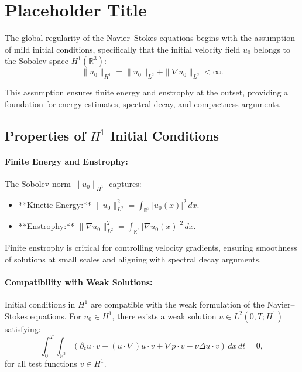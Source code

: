 \section{Placeholder Title}

The global regularity of the Navier--Stokes equations begins with the assumption of mild initial conditions, specifically that the initial velocity field $u_0$ belongs to the Sobolev space $H^1(\mathbb{R}^3)$:
\begin{equation}
\|u_0\|_{H^1} = \|u_0\|_{L^2} + \|\nabla u_0\|_{L^2} < \infty.
\end{equation}

This assumption ensures finite energy and enstrophy at the outset, providing a foundation for energy estimates, spectral decay, and compactness arguments.

\subsection{Properties of $H^1$ Initial Conditions}

\paragraph{Finite Energy and Enstrophy:}
The Sobolev norm $\|u_0\|_{H^1}$ captures:
\begin{itemize}
    \item **Kinetic Energy:** $\|u_0\|_{L^2}^2 = \int_{\mathbb{R}^3} |u_0(x)|^2 \, dx$.
    \item **Enstrophy:** $\|\nabla u_0\|_{L^2}^2 = \int_{\mathbb{R}^3} |\nabla u_0(x)|^2 \, dx$.
\end{itemize}
Finite enstrophy is critical for controlling velocity gradients, ensuring smoothness of solutions at small scales and aligning with spectral decay arguments.

\paragraph{Compatibility with Weak Solutions:}
Initial conditions in $H^1$ are compatible with the weak formulation of the Navier--Stokes equations. For $u_0 \in H^1$, there exists a weak solution $u \in L^2(0, T; H^1)$ satisfying:
\begin{equation}
\int_0^T \int_{\mathbb{R}^3} \left( \partial_t u \cdot v + (u \cdot \nabla) u \cdot v + \nabla p \cdot v - \nu \Delta u \cdot v \right) \, dx \, dt = 0,
\end{equation}
for all test functions $v \in H^1$.

